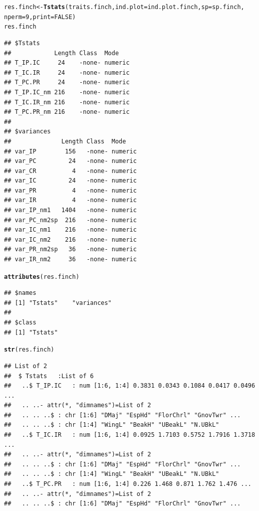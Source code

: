 \documentclass[12pt]{article}\usepackage[]{graphicx}\usepackage[]{color}
\makeatletter
\newcommand{\hlnum}[1]{\textcolor[rgb]{0.686,0.059,0.569}{#1}}%
\newcommand{\hlstd}[1]{\textcolor[rgb]{0.345,0.345,0.345}{#1}}%
\newcommand{\hlkwb}[1]{\textcolor[rgb]{0.69,0.353,0.396}{#1}}%
\newcommand{\hlkwc}[1]{\textcolor[rgb]{0.333,0.667,0.333}{#1}}%
\newcommand{\hlkwd}[1]{\textcolor[rgb]{0.737,0.353,0.396}{\textbf{#1}}}%
\newenvironment{kframe}{%
 \def\at@end@of@kframe{}%
 \ifinner\ifhmode%
  \def\at@end@of@kframe{\end{minipage}}%
  \begin{minipage}{\columnwidth}%
 \fi\fi%
 \def\FrameCommand##1{\hskip\@totalleftmargin \hskip-\fboxsep
 \colorbox{shadecolor}{##1}\hskip-\fboxsep
     \hskip-\linewidth \hskip-\@totalleftmargin \hskip\columnwidth}%
 \MakeFramed {\advance\hsize-\width
   \@totalleftmargin\z@ \linewidth\hsize
   \@setminipage}}%
 {\par\unskip\endMakeFramed%
 \at@end@of@kframe}
\newenvironment{knitrout}{}{} %
\makeatother
\begin{document}
\begin{knitrout}
\color{fgcolor}\begin{kframe}
\begin{alltt}
\hlstd{res.finch}\hlkwb{<-}\hlkwd{Tstats}\hlstd{(traits.finch,} \hlkwc{ind.plot}\hlstd{=ind.plot.finch,} \hlkwc{sp}\hlstd{=sp.finch,}
                  \hlkwc{nperm}\hlstd{=}\hlnum{9}\hlstd{,} \hlkwc{print}\hlstd{=}\hlnum{FALSE}\hlstd{)}
\hlstd{res.finch}
\end{alltt}
\begin{verbatim}
## $Tstats
##            Length Class  Mode   
## T_IP.IC     24    -none- numeric
## T_IC.IR     24    -none- numeric
## T_PC.PR     24    -none- numeric
## T_IP.IC_nm 216    -none- numeric
## T_IC.IR_nm 216    -none- numeric
## T_PC.PR_nm 216    -none- numeric
## 
## $variances
##              Length Class  Mode   
## var_IP        156   -none- numeric
## var_PC         24   -none- numeric
## var_CR          4   -none- numeric
## var_IC         24   -none- numeric
## var_PR          4   -none- numeric
## var_IR          4   -none- numeric
## var_IP_nm1   1404   -none- numeric
## var_PC_nm2sp  216   -none- numeric
## var_IC_nm1    216   -none- numeric
## var_IC_nm2    216   -none- numeric
## var_PR_nm2sp   36   -none- numeric
## var_IR_nm2     36   -none- numeric
\end{verbatim}
\begin{alltt}
\hlkwd{attributes}\hlstd{(res.finch)}
\end{alltt}
\begin{verbatim}
## $names
## [1] "Tstats"    "variances"
## 
## $class
## [1] "Tstats"
\end{verbatim}
\begin{alltt}
\hlkwd{str}\hlstd{(res.finch)}
\end{alltt}
\begin{verbatim}
## List of 2
##  $ Tstats   :List of 6
##   ..$ T_IP.IC   : num [1:6, 1:4] 0.3831 0.0343 0.1084 0.0417 0.0496 ...
##   .. ..- attr(*, "dimnames")=List of 2
##   .. .. ..$ : chr [1:6] "DMaj" "EspHd" "FlorChrl" "GnovTwr" ...
##   .. .. ..$ : chr [1:4] "WingL" "BeakH" "UBeakL" "N.UBkL"
##   ..$ T_IC.IR   : num [1:6, 1:4] 0.0925 1.7103 0.5752 1.7916 1.3718 ...
##   .. ..- attr(*, "dimnames")=List of 2
##   .. .. ..$ : chr [1:6] "DMaj" "EspHd" "FlorChrl" "GnovTwr" ...
##   .. .. ..$ : chr [1:4] "WingL" "BeakH" "UBeakL" "N.UBkL"
##   ..$ T_PC.PR   : num [1:6, 1:4] 0.226 1.468 0.871 1.762 1.476 ...
##   .. ..- attr(*, "dimnames")=List of 2
##   .. .. ..$ : chr [1:6] "DMaj" "EspHd" "FlorChrl" "GnovTwr" ...

\end{verbatim}
\end{kframe}
\end{knitrout}
\end{document}

